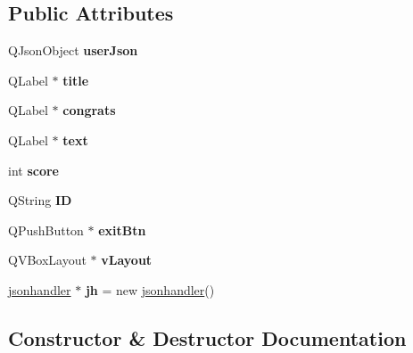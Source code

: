 \subsection*{Public Attributes}
\begin{DoxyCompactItemize}
\item 
\mbox{\label{classtimeUp_ab10c6a95b213c06f95a289eb2a6c188e}} 
Q\+Json\+Object {\bfseries user\+Json}
\item 
\mbox{\label{classtimeUp_a7c9045116d3a37e932441ae11e159ec6}} 
Q\+Label $\ast$ {\bfseries title}
\item 
\mbox{\label{classtimeUp_ae5fd47a31b619e0a1f00234be0afbda5}} 
Q\+Label $\ast$ {\bfseries congrats}
\item 
\mbox{\label{classtimeUp_a879a5bdb9943496d035c2b6a7ce97ad3}} 
Q\+Label $\ast$ {\bfseries text}
\item 
\mbox{\label{classtimeUp_adf2f4aa5469966f4f154c120d7a72227}} 
int {\bfseries score}
\item 
\mbox{\label{classtimeUp_a5e31d3b089b22171726ed58df6c82041}} 
Q\+String {\bfseries ID}
\item 
\mbox{\label{classtimeUp_a61e7b1c71590020859f4a21b4b9af244}} 
Q\+Push\+Button $\ast$ {\bfseries exit\+Btn}
\item 
\mbox{\label{classtimeUp_aca9594fa2b0e29fb397d2fb97d98b1e5}} 
Q\+V\+Box\+Layout $\ast$ {\bfseries v\+Layout}
\item 
\mbox{\label{classtimeUp_a7569031bed14ca848099c05d2a5fd1a5}} 
\hyperlink{classjsonhandler}{jsonhandler} $\ast$ {\bfseries jh} = new \hyperlink{classjsonhandler}{jsonhandler}()
\end{DoxyCompactItemize}


\subsection{Constructor \& Destructor Documentation}
\mbox{\label{classtimeUp_a462717224a7754296209355928f97ab1}} 
